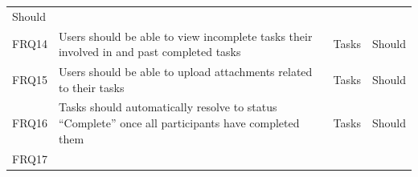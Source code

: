 \begin{longtable}[]{@{}llll@{}}
\begin{minipage}[t]{0.09\columnwidth}
Should\strut
\end{minipage}\tabularnewline
\begin{minipage}[t]{0.04\columnwidth}\raggedright\strut
FRQ14\strut
\end{minipage} & \begin{minipage}[t]{0.64\columnwidth}\raggedright\strut
Users should be able to view incomplete tasks their involved in and past
completed tasks\strut
\end{minipage} & \begin{minipage}[t]{0.12\columnwidth}\raggedright\strut
Tasks\strut
\end{minipage} & \begin{minipage}[t]{0.09\columnwidth}\raggedright\strut
Should\strut
\end{minipage}\tabularnewline
\begin{minipage}[t]{0.04\columnwidth}\raggedright\strut
FRQ15\strut
\end{minipage} & \begin{minipage}[t]{0.64\columnwidth}\raggedright\strut
Users should be able to upload attachments related to their tasks\strut
\end{minipage} & \begin{minipage}[t]{0.12\columnwidth}\raggedright\strut
Tasks\strut
\end{minipage} & \begin{minipage}[t]{0.09\columnwidth}\raggedright\strut
Should\strut
\end{minipage}\tabularnewline
\begin{minipage}[t]{0.04\columnwidth}\raggedright\strut
FRQ16\strut
\end{minipage} & \begin{minipage}[t]{0.64\columnwidth}\raggedright\strut
Tasks should automatically resolve to status ``Complete'' once all
participants have completed them\strut
\end{minipage} & \begin{minipage}[t]{0.12\columnwidth}\raggedright\strut
Tasks\strut
\end{minipage} & \begin{minipage}[t]{0.09\columnwidth}\raggedright\strut
Should\strut
\end{minipage}\tabularnewline
\begin{minipage}[t]{0.04\columnwidth}\raggedright\strut
FRQ17\strut
\end{minipage} & \begin{minipage}[t]{0.64\columnwidth}\raggedright\strut

\end{minipage}
\end{longtable}
